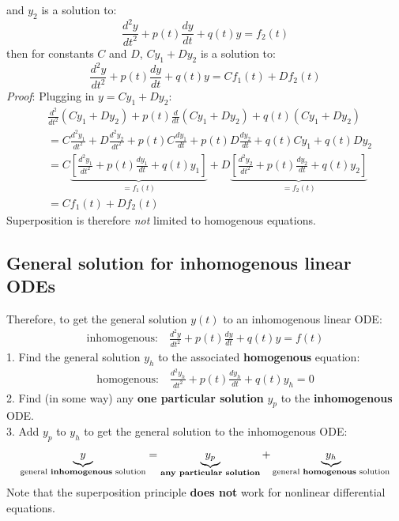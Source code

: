 \documentclass{report}
\begin{document}
and $y_2$ is a solution to:
\begin{equation*}
\frac{d^2y}{dt^2}+p(t)\frac{dy}{dt}+q(t)y=f_2(t)
\end{equation*}
then for constants $C$ and $D$, $Cy_1+Dy_2$ is a solution to:
\begin{equation*}
\frac{d^2y}{dt^2}+p(t)\frac{dy}{dt}+q(t)y=Cf_1(t)+Df_2(t)
\end{equation*}
\textit{Proof}: Plugging in $y=Cy_1+Dy_2$:
\begin{align*}
&\frac{d^2}{dt^2}(Cy_1+Dy_2)+p(t)\frac{d}{dt}(Cy_1+Dy_2)+q(t)(Cy_1+Dy_2) \\
&=C\frac{d^2y_1}{dt^2}+D\frac{d^2y_2}{dt^2}+p(t)C\frac{dy_1}{dt}+p(t)D\frac{dy_2}{dt}
+q(t)Cy_1+q(t)Dy_2\\
&=C\underbrace{\left[\frac{d^2y_1}{dt^2}+p(t)\frac{dy_1}{dt}+q(t)y_1\right]}_{=f_1(t)}
+D\underbrace{\left[\frac{d^2y_2}{dt^2}+p(t)\frac{dy_2}{dt}+q(t)y_2\right]}_{=f_2(t)}\\
&=Cf_1(t)+Df_2(t)
\end{align*}
Superposition is therefore \textit{not} limited to homogenous equations.

\subsection{General solution for inhomogenous linear ODEs} %
Therefore, to get the general solution $y(t)$ to an inhomogenous linear ODE:
\begin{align*}
\text{inhomogenous:}\quad\frac{d^2y}{dt^2}+p(t)\frac{dy}{dt}+q(t)y=f(t)
\end{align*}
1. Find the general solution $y_h$ to the associated \textbf{homogenous} equation:
\begin{align*}
\text{homogenous:}\quad\frac{d^2y_h}{dt^2}+p(t)\frac{dy_h}{dt}+q(t)y_h=0
\end{align*}
2. Find (in some way) any \textbf{one particular solution} $y_p$ to the \textbf{inhomogenous} ODE.
\\
3. Add $y_p$ to $y_h$ to get the general solution to the inhomogenous ODE:
\begin{align*}
\underbrace{y}_{\text{general \textbf{inhomogenous} solution}}=
\underbrace{y_p}_{\text{\textbf{any particular solution}}}+
\underbrace{y_h}_{\text{general \textbf{homogenous} solution}}
\end{align*}
Note that the superposition principle \textbf{does not} work for nonlinear differential equations.
\end{document}
